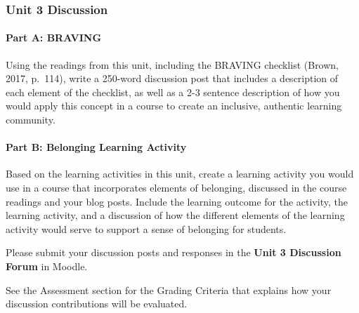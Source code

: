 \documentclass[
]{book}
\begin{document}
\begin{assessment}
\hypertarget{unit-3-discussion}{%
\subsubsection{Unit 3 Discussion}\label{unit-3-discussion}}

\hypertarget{part-a-braving}{%
\paragraph{Part A: BRAVING}\label{part-a-braving}}

Using the readings from this unit, including the BRAVING checklist
(Brown, 2017, p.~114), write a 250-word discussion post that includes a
description of each element of the checklist, as well as a 2-3 sentence
description of how you would apply this concept in a course to create an
inclusive, authentic learning community.

\hypertarget{part-b-belonging-learning-activity}{%
\paragraph{Part B: Belonging Learning
Activity}\label{part-b-belonging-learning-activity}}

Based on the learning activities in this unit, create a learning
activity you would use in a course that incorporates elements of
belonging, discussed in the course readings and your blog posts. Include
the learning outcome for the activity, the learning activity, and a
discussion of how the different elements of the learning activity would
serve to support a sense of belonging for students.

Please submit your discussion posts and responses in the \textbf{Unit 3
Discussion Forum} in Moodle.

See the Assessment section for the Grading Criteria that explains how
your discussion contributions will be evaluated.
\end{assessment}
\end{document}
